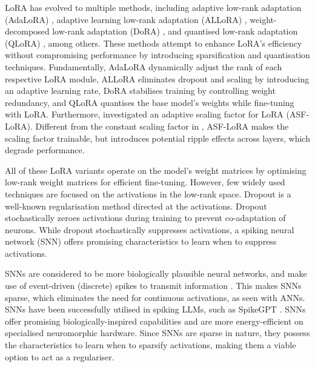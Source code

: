 \documentclass{article} %
\begin{document}
LoRA has evolved to multiple methods, including adaptive low-rank adaptation (AdaLoRA) \citep{zhang_adalora_2023-1}, adaptive learning low-rank adaptation (ALLoRA) \citep{huang_allora_2024}, weight-decomposed low-rank adaptation (DoRA) \citep{liu_dora_2024}, and quantised low-rank adaptation (QLoRA) \citep{dettmers_qlora_2023-1}, among others. These methods attempt to enhance LoRA's efficiency without compromising performance by introducing sparsification and quantisation techniques. Fundamentally, AdaLoRA dynamically adjust the rank of each respective LoRA module, ALLoRA eliminates dropout and scaling by introducing an adaptive learning rate, DoRA stabilises training by controlling weight redundancy, and QLoRA quantises the base model's weights while fine-tuning with LoRA. Furthermore, \citet{huang_allora_2024} investigated an adaptive scaling factor for LoRA (ASF-LoRA). Different from the constant scaling factor in \cite{hu_lora_2021}, ASF-LoRA makes the scaling factor trainable, but introduces potential ripple effects across layers, which degrade performance.

All of these LoRA variants operate on the model's weight matrices by optimising low-rank weight matrices for efficient fine-tuning. However, few widely used techniques are focused on the activations in the low-rank space. Dropout \citep{srivastava_dropout_2014} is a well-known regularisation method directed at the activations. Dropout stochastically zeroes activations during training to prevent co-adaptation of neurons. While dropout stochastically suppresses activations, a spiking neural network (SNN) offers promising characteristics to learn when to suppress activations.

SNNs are considered to be more biologically plausible neural networks, and make use of event-driven (discrete) spikes to transmit information \citep{singh_nebula_2020}. This makes SNNs sparse, which eliminates the need for continuous activations, as seen with ANNs. SNNs have been successfully utilised in spiking LLMs, such as SpikeGPT \citep{zhu_spikegpt_2024-1}. SNNs offer promising biologically-inspired capabilities and are more energy-efficient on specialised neuromorphic hardware. 
Since SNNs are sparse in nature, they possess the characteristics to learn when to sparsify activations, making them a viable option to act as a regulariser.
\end{document}
